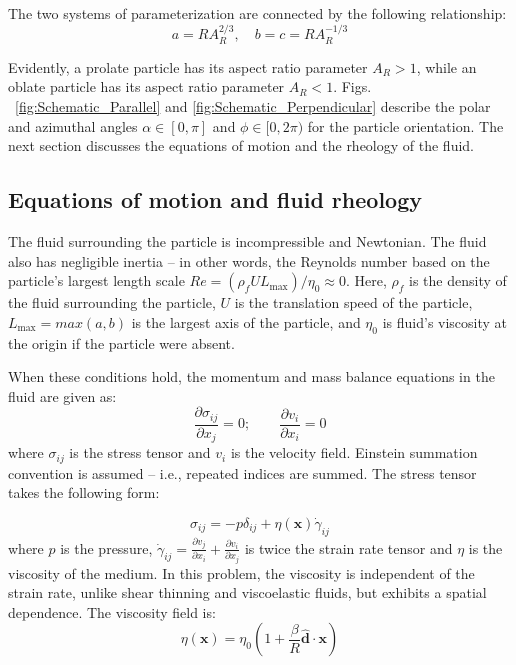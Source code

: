 \documentclass{jfm}
\begin{document}
The two systems of parameterization are connected by the following relationship:
\begin{equation}
\label{eq:part_def_2}
a=R A_{R}^{2 / 3}, \quad b=c= R A_R^{-1/3} 
\end{equation}
 
Evidently, a prolate particle has its aspect ratio parameter $A_R > 1$, while an oblate particle has its aspect ratio parameter $A_R < 1$.
Figs. ~\ref{fig:Schematic_Parallel} and \ref{fig:Schematic_Perpendicular} describe the polar and azimuthal angles $\alpha \in [0,\pi]$ and $ \phi \in [0,2\pi)$  for the particle orientation.  The next section discusses the equations of motion and the rheology of the fluid.





\subsection{Equations of motion and fluid rheology}
\label{sec:rheology}

The fluid surrounding the particle is incompressible and Newtonian.  The fluid also has negligible inertia – in other words, the Reynolds number based on the particle’s largest length scale 
$Re=(\rho_f U L_{\text{max}})/\eta_0 \approx 0 $. Here, $\rho_f$ is the density of the fluid surrounding the particle, $U$ is the translation speed of the particle, $L_{\text{max}} =max(a,b)$ is the largest axis of the particle, and $\eta_0$ is fluid's viscosity at the origin if the particle were absent. 

When these conditions hold, the momentum and mass balance equations in the fluid are given as:
\begin{equation}
\label{eq:stress_balance}
\frac{\partial \sigma_{ij}}{\partial x_j}=0; \qquad \frac{\partial v_i}{\partial x_i}=0
\end{equation}
where $\sigma_{ij}$ is the stress tensor and $v_i$ is the  velocity field. Einstein summation convention is assumed -- i.e., repeated indices are summed. The stress tensor takes the following form:

\begin{equation}
\label{eq:stress_definition}
    \sigma_{ij} =-p\delta_{ij}+\eta(\boldsymbol{x})\dot{\gamma}_{ij}
\end{equation}
where $p$ is the pressure,  $\dot{\gamma}_{ij} = \frac{\partial v_j}{\partial x_i}+\frac{\partial v_i}{\partial x_j}$ is twice the strain rate tensor and $\eta$ is the viscosity of the medium. In this problem, the viscosity is independent of the strain rate, unlike shear thinning \citep{Anand2014,ACJHT_2019} and viscoelastic \citep{Anand_2016}fluids, but exhibits a spatial dependence. The viscosity field is:
\begin{equation}
\label{eq:viscosity_variation_general}
    \eta(\boldsymbol{x}) =\eta_{0}\left( 1 +\frac{\beta}{R} \boldsymbol{\hat{d}} \cdot \boldsymbol{x} \right)
\end{equation}
\end{document}
